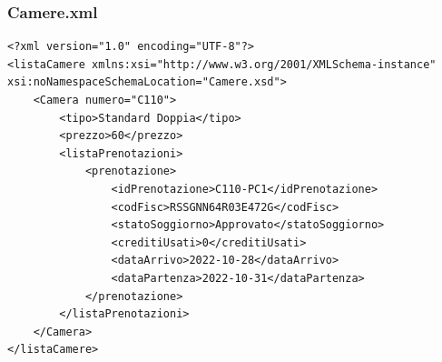 \documentclass [a4paper, 12pt]{book}
\begin{document}
\subsubsection{Camere.xml}
\begin{lstlisting}[style=XML] 	
<?xml version="1.0" encoding="UTF-8"?>
<listaCamere xmlns:xsi="http://www.w3.org/2001/XMLSchema-instance" xsi:noNamespaceSchemaLocation="Camere.xsd">
    <Camera numero="C110">
        <tipo>Standard Doppia</tipo>
        <prezzo>60</prezzo>
        <listaPrenotazioni>
            <prenotazione>
                <idPrenotazione>C110-PC1</idPrenotazione>
                <codFisc>RSSGNN64R03E472G</codFisc>
                <statoSoggiorno>Approvato</statoSoggiorno>
                <creditiUsati>0</creditiUsati>
                <dataArrivo>2022-10-28</dataArrivo>
                <dataPartenza>2022-10-31</dataPartenza>
            </prenotazione>
        </listaPrenotazioni>
    </Camera>
</listaCamere>
\end{lstlisting}
\end{document}

